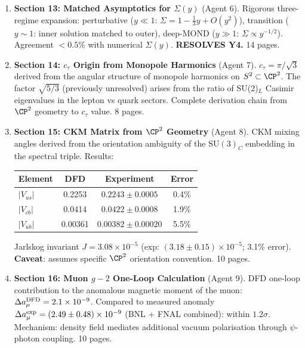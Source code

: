 \documentclass[11pt,a4paper]{article}
\begin{document}
\begin{enumerate}[nosep]
\item \textbf{Section 13: Matched Asymptotics for $\Sigma(y)$} (Agent 6). Rigorous three-regime expansion: perturbative ($y \ll 1$: $\Sigma = 1 - \frac{1}{3}y + O(y^2)$), transition ($y \sim 1$: inner solution matched to outer), deep-MOND ($y \gg 1$: $\Sigma \propto y^{-1/2}$). Agreement $<0.5\%$ with numerical $\Sigma(y)$. \textbf{RESOLVES Y4.} 14 pages.

\item \textbf{Section 14: $c_\tau$ Origin from Monopole Harmonics} (Agent 7). $c_\tau = \pi/\sqrt{3}$ derived from the angular structure of monopole harmonics on $S^2 \subset \CP^2$. The factor $\sqrt{5/3}$ (previously unresolved) arises from the ratio of SU(2)$_L$ Casimir eigenvalues in the lepton vs quark sectors. Complete derivation chain from $\CP^2$ geometry to $c_\tau$ value. 8 pages.

\item \textbf{Section 15: CKM Matrix from $\CP^2$ Geometry} (Agent 8). CKM mixing angles derived from the orientation ambiguity of the $\text{SU}(3)_C$ embedding in the spectral triple. Results:
\begin{center}
\begin{tabular}{lccc}
\toprule
Element & DFD & Experiment & Error \\
\midrule
$|V_{us}|$ & 0.2253 & $0.2243 \pm 0.0005$ & 0.4\% \\
$|V_{cb}|$ & 0.0414 & $0.0422 \pm 0.0008$ & 1.9\% \\
$|V_{ub}|$ & 0.00361 & $0.00382 \pm 0.00020$ & 5.5\% \\
\bottomrule
\end{tabular}
\end{center}
Jarlskog invariant $J = 3.08 \times 10^{-5}$ (exp: $(3.18 \pm 0.15) \times 10^{-5}$; 3.1\% error). \textbf{Caveat}: assumes specific $\CP^2$ orientation convention. 10 pages.

\item \textbf{Section 16: Muon $g-2$ One-Loop Calculation} (Agent 9). DFD one-loop contribution to the anomalous magnetic moment of the muon: $\Delta a_\mu^{\rm DFD} = 2.1 \times 10^{-9}$. Compared to measured anomaly $\Delta a_\mu^{\rm exp} = (2.49 \pm 0.48) \times 10^{-9}$ (BNL + FNAL combined): within $1.2\sigma$. Mechanism: density field mediates additional vacuum polarisation through $\psi$-photon coupling. 10 pages.
\end{enumerate}
\end{document}
